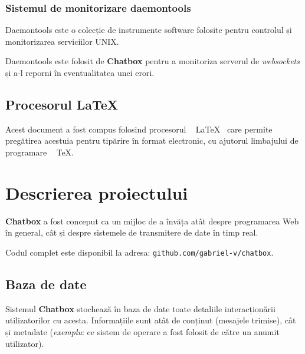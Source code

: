 \documentclass[12pt,a4paper]{article}
\begin{document}
\subsubsection{Sistemul de monitorizare daemontools}
Daemontools\cite{daemon} este o colecție de instrumente software folosite pentru 
controlul și monitorizarea serviciilor UNIX. 

Daemontools este folosit de \textbf{Chatbox} pentru a monitoriza serverul 
de \textit{websockets} și a-l reporni  în eventualitatea unei erori.

\subsection{Procesorul \LaTeX}
Acest document a fost compus folosind procesorul ~ \LaTeX ~ care permite pregătirea
acestuia pentru tipărire în format electronic,
cu ajutorul limbajului de programare ~ \TeX.



\newpage
\section{Descrierea proiectului}
\textbf{Chatbox} a fost conceput ca un mijloc de a învăța atât despre programarea
Web în general, cât și despre sistemele de transmitere de date în timp real.

Codul complet este disponibil la adresa: \texttt{github.com/gabriel-v/chatbox}.

\subsection{Baza de date}
Sistemul \textbf{Chatbox} stochează  în baza de date toate detaliile interacționării
utilizatorilor cu acesta. Informațiile sunt atât de conținut 
(mesajele trimise), cât și metadate (\textit{exemplu}: ce sistem de operare a fost folosit de către un anumit utilizator).

\end{document}
